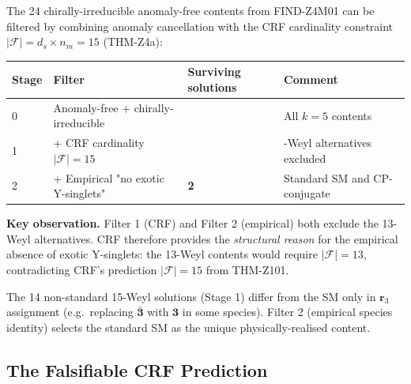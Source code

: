 \documentclass[12pt, a4paper]{article}
\begin{document}
\begin{formalbox}[title={FIND-Z4M02: CRF as a filter on anomaly-free contents (NEW v17.5)}]
The 24 chirally-irreducible anomaly-free contents from FIND-Z4M01 can
be filtered by combining anomaly cancellation with the CRF cardinality
constraint $|\mathcal{F}| = d_s \times n_m = 15$ (THM-Z4a):

\begin{center}
{\small
\renewcommand{\arraystretch}{1.30}
\begin{tabular}{ll>{\centering\arraybackslash}p{3.0cm}>{\raggedright\arraybackslash}p{4.0cm}}
\toprule
Stage & Filter & Surviving solutions & Comment \\
\midrule
0 & Anomaly-free + chirally-irreducible & 24 & All $k = 5$ contents \\
1 & + CRF cardinality $|\mathcal{F}| = 15$ & 16 & 13-Weyl alternatives excluded \\
2 & + Empirical "no exotic Y-singlets" & \textbf{2} & Standard SM and CP-conjugate \\
\bottomrule
\end{tabular}
}
\end{center}

\textbf{Key observation.} Filter 1 (CRF) and Filter 2 (empirical) both
exclude the 13-Weyl alternatives. CRF therefore provides the
\emph{structural reason} for the empirical absence of exotic Y-singlets:
the 13-Weyl contents would require $|\mathcal{F}| = 13$, contradicting
CRF's prediction $|\mathcal{F}| = 15$ from THM-Z101.

The 14 non-standard 15-Weyl solutions (Stage 1) differ from the SM only
in $\mathbf{r}_3$ assignment (e.g.\ replacing $\bar{\mathbf{3}}$ with
$\mathbf{3}$ in some species). Filter 2 (empirical species identity)
selects the standard SM as the unique physically-realised content.
\end{formalbox}

\subsection{The Falsifiable CRF Prediction}
\end{document}
